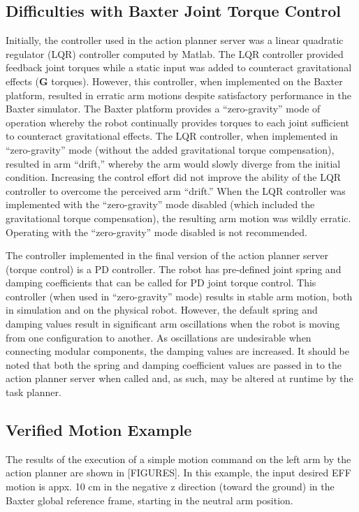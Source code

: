 \subsection{Difficulties with Baxter Joint Torque Control}
Initially, the controller used in the action planner server was a linear quadratic regulator (LQR) controller computed by Matlab.
The LQR controller provided feedback joint torques while a static input was added to counteract gravitational effects ($\mathbf{G}$ torques).
However, this controller, when implemented on the Baxter platform, resulted in erratic arm motions despite satisfactory performance in the Baxter simulator.
The Baxter platform provides a ``zero-gravity'' mode of operation whereby the robot continually provides torques to each joint sufficient to counteract gravitational effects.
The LQR controller, when implemented in ``zero-gravity'' mode (without the added gravitational torque compensation), resulted in arm ``drift,'' whereby the arm would slowly diverge from the initial condition.
Increasing the control effort did not improve the ability of the LQR controller to overcome the perceived arm ``drift.''
When the LQR controller was implemented with the ``zero-gravity'' mode disabled (which included the gravitational torque compensation), the resulting arm motion was wildly erratic.
Operating with the ``zero-gravity'' mode disabled is not recommended.

The controller implemented in the final version of the action planner server (torque control) is a PD controller.
The robot has pre-defined joint spring and damping coefficients that can be called for PD joint torque control.
This controller (when used in ``zero-gravity'' mode) results in stable arm motion, both in simulation and on the physical robot.
However, the default spring and damping values result in significant arm oscillations when the robot is moving from one configuration to another.
As oscillations are undesirable when connecting modular components, the damping values are increased.
It should be noted that both the spring and damping coefficient values are passed in to the action planner server when called and, as such, may be altered at runtime by the task planner.

\subsection{Verified Motion Example}
The results of the execution of a simple motion command on the left arm by the action planner are shown in [FIGURES].
In this example, the input desired EFF motion is appx. 10 cm in the negative z direction (toward the ground) in the Baxter global reference frame, starting in the neutral arm position.










